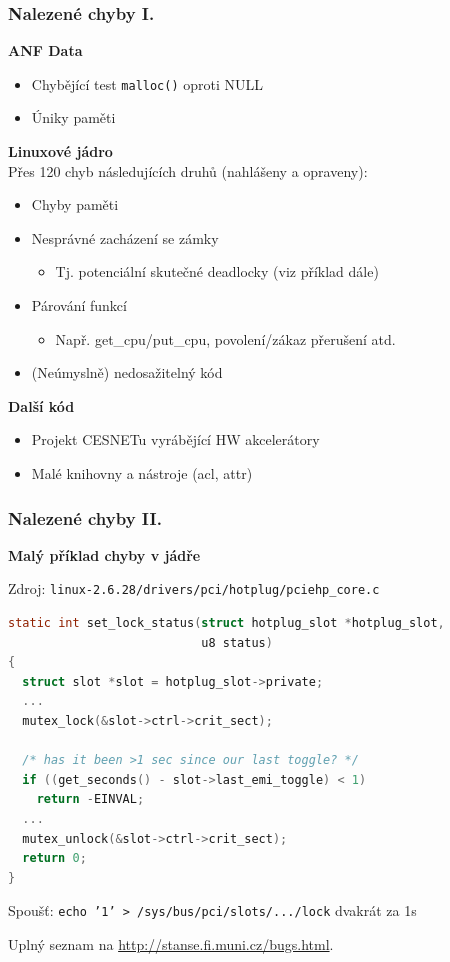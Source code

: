 \documentclass[handout,xcolor=dvipsnames]{beamer}
\newcommand{\heading}[1]{\textbf{\textcolor{BurntOrange}{#1}}}
\begin{document}
\begin{frame}
  \frametitle{Nalezené chyby I.}
  
  \heading{ANF Data}
  \begin{itemize}
  \item Chybějící test \texttt{malloc()} oproti NULL
  \item Úniky paměti
  \end{itemize}

  \pause
  \medskip

  \heading{Linuxové jádro}\\
  Přes 120 chyb následujících druhů (nahlášeny a opraveny):
  \begin{itemize}
  \item Chyby paměti
  \item Nesprávné zacházení se zámky
    \begin{itemize}
    \item Tj. potenciální skutečné deadlocky (viz příklad dále)
    \end{itemize}
  \item Párování funkcí
    \begin{itemize}
    \item Např. get\_cpu/put\_cpu, povolení/zákaz přerušení atd.
    \end{itemize}
  \item (Neúmyslně) nedosažitelný kód
  \end{itemize}

  \pause
  \medskip

  \heading{Další kód}
  \begin{itemize}
  \item Projekt CESNETu vyrábějící HW akcelerátory
  \item Malé knihovny a nástroje (acl, attr)
  \end{itemize}
\end{frame}

\begin{frame}[fragile]
  \frametitle{Nalezené chyby II.}

  \heading{Malý příklad chyby v jádře}

  Zdroj: \texttt{\small linux-2.6.28/drivers/pci/hotplug/pciehp\_core.c}
  \begin{lstlisting}[language=C]
static int set_lock_status(struct hotplug_slot *hotplug_slot,
                           u8 status)
{
  struct slot *slot = hotplug_slot->private;
  ...
  mutex_lock(&slot->ctrl->crit_sect);

  /* has it been >1 sec since our last toggle? */
  if ((get_seconds() - slot->last_emi_toggle) < 1)
    return -EINVAL;
  ...
  mutex_unlock(&slot->ctrl->crit_sect);
  return 0;
}
  \end{lstlisting}

  Spoušť: \texttt{\small echo '1' > /sys/bus/pci/slots/.../lock} dvakrát za 1s

  \pause
  \medskip

  Uplný seznam na \url{http://stanse.fi.muni.cz/bugs.html}.

\end{frame}
\end{document}
